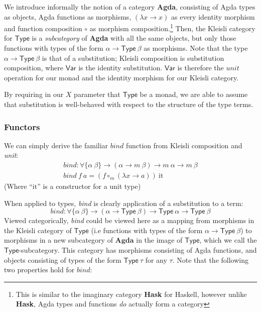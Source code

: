 \documentclass[a4paper]{jfp}
\begin{document}
We introduce informally the notion of a category \textbf{Agda}, consisting of Agda types as objects, Agda functions as morphisms, $(\lambda x
\rightarrow x)$ as every identity morphism and function composition $\circ$ as morphism composition.\footnote{This is similar to the imaginary
   category \textbf{Hask} for Haskell, however unlike \textbf{Hask}, Agda types and functions \emph{do} actually form a category} Then, the Kleisli
category for $\textsf{Type}$ is a \emph{subcategory} of \textbf{Agda} with all the same objects, but only those functions with types of the form
$\alpha \rightarrow \textsf{Type}\ \beta$ as morphisms. Note that the type $\alpha \rightarrow \textsf{Type}\ \beta$ is that of a substitution;
Kleisli composition is substitution composition, where $\textsf{Var}$ is the identity substitution. $\textsf{Var}$ is therefore the $\mathit{unit}$
operation for our monad and the identity morphism for our Kleisli category.

By requiring in our $X$ parameter that $\textsf{Type}$ be a monad, we are able to assume that substitution is well-behaved with respect to the
structure of the type terms. 

\subsubsection{Functors}

We can simply derive the familiar $\mathit{bind}$ function from Kleisli composition and \emph{unit}:
\begin{displaymath}
   \begin{array}{ll}
	\mathit{bind} : \forall \{ \alpha\ \beta \} \rightarrow (\alpha \rightarrow m\ \beta) \rightarrow m\ \alpha \rightarrow m\ \beta \\
   \mathit{bind}\ f\ a = (f \circ_m (\lambda x \rightarrow a))\ \text{it}
   \end{array}
\end{displaymath}
(Where ``$\text{it}$'' is a constructor for a unit type)

When applied to types, \emph{bind} is clearly application of a substitution to a term:
\begin{displaymath}
	\mathit{bind} : \forall \{\alpha\ \beta \} \rightarrow (\alpha \rightarrow \textsf{Type}\ \beta) \rightarrow \textsf{Type}\ \alpha \rightarrow \textsf{Type}\ \beta
\end{displaymath}
Viewed categorically, \emph{bind} could be viewed here as a mapping from morphisms in the Kleisli category of $\textsf{Type}$ (i.e functions with
types of the form $\alpha \rightarrow \textsf{Type}\ \beta$) to morphisms in a new subcategory of $\textbf{Agda}$ in the image of $\textsf{Type}$,
which we call the $\textsf{Type}$-subcategory. This category has morphisms consisting of Agda functions, and objects consisting of types of the form
$\textsf{Type}\ \tau$ for any $\tau$. Note that the following two properties hold for $\mathit{bind}$:
\end{document}

